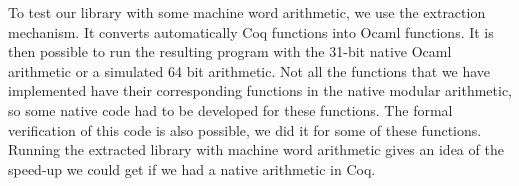 To test our library with some machine word arithmetic, we use the extraction
mechanism. 
It converts automatically {\sc Coq} functions into {\sc Ocaml} functions.
It is then possible to run the resulting program with the 31-bit native
{\sc Ocaml} arithmetic or a simulated 64 bit arithmetic. 
Not all the functions that we have implemented have their corresponding 
functions in the native modular arithmetic, 
so some native code had to be developed for these functions.
The formal verification of this code is also possible, we did it for some of these
functions. Running the extracted library with machine word arithmetic
gives an idea of the speed-up we could get if we had a native arithmetic in Coq.


